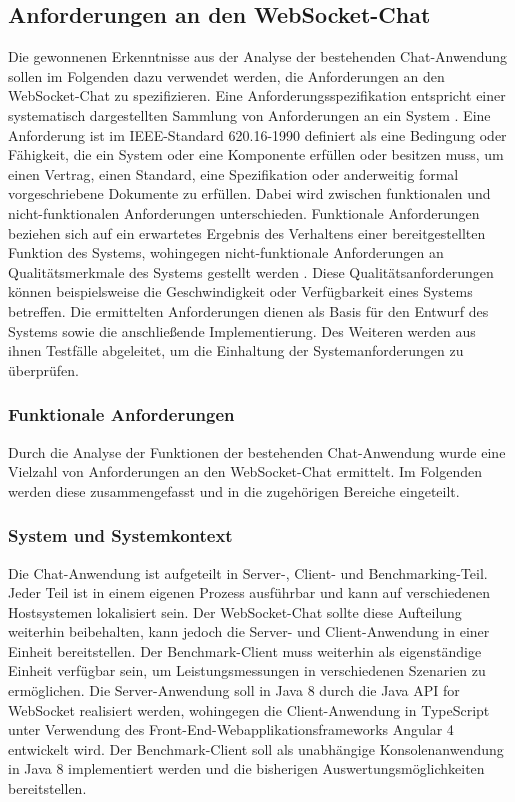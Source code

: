 \documentclass[11pt,a4paper,titlepage]{scrartcl}
\numberwithin{equation}{section}
\begin{document}
\subsection{Anforderungen an den WebSocket-Chat}
Die gewonnenen Erkenntnisse aus der Analyse der bestehenden Chat-Anwendung sollen im Folgenden dazu verwendet werden, die Anforderungen an den WebSocket-Chat zu spezifizieren. Eine Anforderungsspezifikation entspricht einer systematisch dargestellten Sammlung von Anforderungen an ein System \autocite[43]{pohl_basiswissen_2009}. Eine Anforderung ist im IEEE-Standard 620.16-1990 definiert als \glqq eine Bedingung oder Fähigkeit, die ein System oder eine Komponente erfüllen oder besitzen muss, um einen Vertrag, einen Standard, eine Spezifikation oder anderweitig formal vorgeschriebene Dokumente zu erfüllen.\grqq{} Dabei wird zwischen funktionalen und nicht-funktionalen Anforderungen unterschieden. Funktionale Anforderungen beziehen sich auf ein erwartetes Ergebnis des Verhaltens einer bereitgestellten Funktion des Systems, wohingegen nicht-funktionale Anforderungen an Qualitätsmerkmale des Systems gestellt werden \autocite[16]{pohl_basiswissen_2009}. Diese Qualitätsanforderungen können beispielsweise die Geschwindigkeit oder Verfügbarkeit eines Systems betreffen. Die ermittelten Anforderungen dienen als Basis für den Entwurf des Systems sowie die anschließende Implementierung. Des Weiteren werden aus ihnen Testfälle abgeleitet, um die Einhaltung der Systemanforderungen zu überprüfen. 

\subsubsection{Funktionale Anforderungen}
Durch die Analyse der Funktionen der bestehenden Chat-Anwendung wurde eine Vielzahl von Anforderungen an den WebSocket-Chat ermittelt. Im Folgenden werden diese zusammengefasst und in die zugehörigen Bereiche eingeteilt.
\subsubsection*{System und Systemkontext}
Die Chat-Anwendung ist aufgeteilt in Server-, Client- und Benchmarking-Teil. Jeder Teil ist in einem eigenen Prozess ausführbar und kann auf verschiedenen Hostsystemen lokalisiert sein. Der WebSocket-Chat sollte diese Aufteilung weiterhin beibehalten, kann jedoch die Server- und Client-Anwendung in einer Einheit bereitstellen. Der Benchmark-Client muss weiterhin als eigenständige Einheit verfügbar sein, um Leistungsmessungen in verschiedenen Szenarien zu ermöglichen. Die Server-Anwendung soll in Java 8 durch die Java\texttrademark{} API for WebSocket realisiert werden, wohingegen die Client-Anwendung in TypeScript unter Verwendung des Front-End-Webapplikationsframeworks Angular 4 entwickelt wird. Der Benchmark-Client soll als unabhängige Konsolenanwendung in Java 8 implementiert werden und die bisherigen Auswertungsmöglichkeiten bereitstellen.\\
\end{document}
